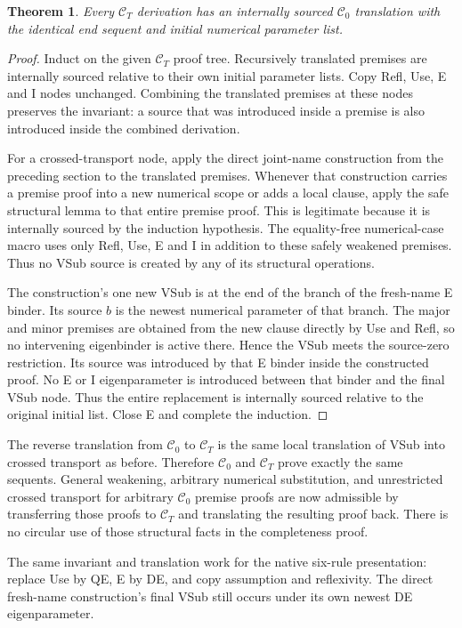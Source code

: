 \documentclass[11pt]{article}
\newtheorem{theorem}{Theorem}[section]
\theoremstyle{definition}
\theoremstyle{remark}
\begin{document}
\begin{theorem}
Every $\mathcal C_T$ derivation has an internally sourced
$\mathcal C_0$ translation with the identical end sequent and initial
numerical parameter list.
\end{theorem}
\begin{proof}
Induct on the given $\mathcal C_T$ proof tree. Recursively translated
premises are internally sourced relative to their own initial
parameter lists. Copy Refl, Use, E and I nodes unchanged. Combining
the translated premises at these nodes preserves the invariant:
a source that was introduced inside a premise is also introduced
inside the combined derivation.

For a crossed-transport node, apply the direct joint-name construction
from the preceding section to the translated premises. Whenever that
construction carries a premise proof into a new numerical scope or
adds a local clause, apply the safe structural lemma to that entire
premise proof. This is legitimate because it is internally sourced by
the induction hypothesis. The equality-free numerical-case macro
uses only Refl, Use, E and I in addition to these safely weakened
premises. Thus no VSub source is created by any of its structural
operations.

The construction's one new VSub is at the end of the branch of the
fresh-name E binder. Its source $b$ is the newest numerical parameter
of that branch. The major and minor premises are obtained from the
new clause directly by Use and Refl, so no intervening eigenbinder
is active there. Hence the VSub meets the source-zero restriction.
Its source was introduced by that E binder inside the constructed
proof. No E or I eigenparameter is introduced between that binder
and the final VSub node. Thus the entire replacement is internally
sourced relative to the original initial list. Close E and complete the induction.
\end{proof}

The reverse translation from $\mathcal C_0$ to $\mathcal C_T$ is the
same local translation of VSub into crossed transport as before.
Therefore $\mathcal C_0$ and $\mathcal C_T$ prove exactly the same
sequents. General weakening, arbitrary numerical substitution, and
unrestricted crossed transport for arbitrary $\mathcal C_0$ premise
proofs are now admissible by transferring those proofs to
$\mathcal C_T$ and translating the resulting proof back. There is no
circular use of those structural facts in the completeness proof.

The same invariant and translation work for the native six-rule
presentation: replace Use by QE, E by DE, and copy assumption and
reflexivity. The direct fresh-name construction's final VSub still
occurs under its own newest DE eigenparameter.
\end{document}
